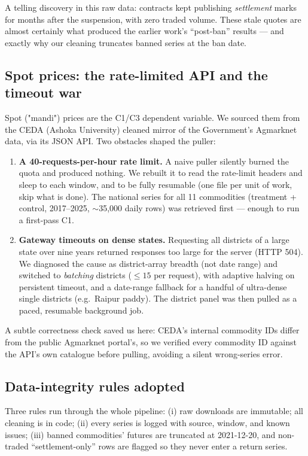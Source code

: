 \documentclass[11pt]{article}
\begin{document}
A telling discovery in this raw data: contracts kept publishing \emph{settlement} marks for
months after the suspension, with zero traded volume. These stale quotes are almost
certainly what produced the earlier work's ``post-ban'' results --- and exactly why our
cleaning truncates banned series at the ban date.

\subsection{Spot prices: the rate-limited API and the timeout war}
Spot ("mandi") prices are the C1/C3 dependent variable. We sourced them from the CEDA
(Ashoka University) cleaned mirror of the Government's Agmarknet data, via its JSON API. Two
obstacles shaped the puller:
\begin{enumerate}[leftmargin=1.6em]
  \item \textbf{A 40-requests-per-hour rate limit.} A naive puller silently burned the
        quota and produced nothing. We rebuilt it to read the rate-limit headers and sleep
        to each window, and to be fully resumable (one file per unit of work, skip what is
        done). The national series for all 11 commodities (treatment + control, 2017--2025,
        $\sim$35{,}000 daily rows) was retrieved first --- enough to run a first-pass C1.
  \item \textbf{Gateway timeouts on dense states.} Requesting all districts of a large
        state over nine years returned responses too large for the server (HTTP 504). We
        diagnosed the cause as district-array breadth (not date range) and switched to
        \emph{batching} districts ($\le 15$ per request), with adaptive halving on
        persistent timeout, and a date-range fallback for a handful of ultra-dense single
        districts (e.g.\ Raipur paddy). The district panel was then pulled as a paced,
        resumable background job.
\end{enumerate}
A subtle correctness check saved us here: CEDA's internal commodity IDs differ from the
public Agmarknet portal's, so we verified every commodity ID against the API's own
catalogue before pulling, avoiding a silent wrong-series error.

\subsection{Data-integrity rules adopted}
Three rules run through the whole pipeline: (i) raw downloads are immutable; all cleaning is
in code; (ii) every series is logged with source, window, and known issues; (iii) banned
commodities' futures are truncated at 2021-12-20, and non-traded ``settlement-only'' rows
are flagged so they never enter a return series.
\end{document}
